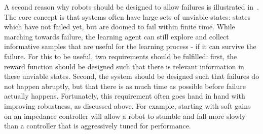 A second reason why robots should be designed to allow failures is illustrated in~\cite{heim2018unviable}. The core concept is that systems often have large sets of unviable states: states which have not failed yet, but are doomed to fail within finite time. While marching towards failure, the learning agent can still explore and collect informative samples that are useful for the learning process - if it can survive the failure. For this to be useful, two requirements should be fulfilled: first, the reward function should be designed such that there is relevant information in these unviable states. Second, the system should be designed such that failures do not happen abruptly, but that there is as much time as possible before failure actually happens. Fortunately, this requirement often goes hand in hand with improving robustness, as discussed above. For example, starting with soft gains on an impedance controller will allow a robot to stumble and fall more slowly than a controller that is aggressively tuned for performance.



